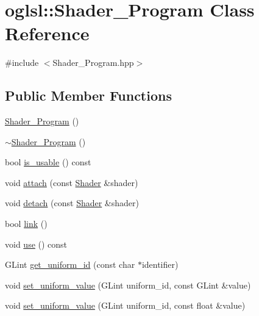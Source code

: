 \hypertarget{classoglsl_1_1_shader___program}{}\section{oglsl\+:\+:Shader\+\_\+\+Program Class Reference}
\label{classoglsl_1_1_shader___program}


{\ttfamily \#include $<$Shader\+\_\+\+Program.\+hpp$>$}

\subsection*{Public Member Functions}
\begin{DoxyCompactItemize}
\item 
\mbox{\hyperlink{classoglsl_1_1_shader___program_ae5615f167ca4f6991ee4d7e75625e8e1}{Shader\+\_\+\+Program}} ()
\item 
\mbox{\hyperlink{classoglsl_1_1_shader___program_a632041a7db2cd19b7be88f4223085cdd}{$\sim$\+Shader\+\_\+\+Program}} ()
\item 
bool \mbox{\hyperlink{classoglsl_1_1_shader___program_abcf1f61c49728e6e4b2ed04bbdcc2413}{is\+\_\+usable}} () const
\item 
void \mbox{\hyperlink{classoglsl_1_1_shader___program_ac3dd7a7611533b0ad8a02dcca9a24a59}{attach}} (const \mbox{\hyperlink{classoglsl_1_1_shader}{Shader}} \&shader)
\item 
void \mbox{\hyperlink{classoglsl_1_1_shader___program_a54aec3bf30b58456f1f454e44618b724}{detach}} (const \mbox{\hyperlink{classoglsl_1_1_shader}{Shader}} \&shader)
\item 
bool \mbox{\hyperlink{classoglsl_1_1_shader___program_a91879ef2ebeee83ffddcbf6d7ec6904c}{link}} ()
\item 
void \mbox{\hyperlink{classoglsl_1_1_shader___program_ad68bd3ebd1b96464cb5708588e050044}{use}} () const
\item 
G\+Lint \mbox{\hyperlink{classoglsl_1_1_shader___program_a50588c2337e31efed044eb24f05d2e4e}{get\+\_\+uniform\+\_\+id}} (const char $\ast$identifier)
\item 
void \mbox{\hyperlink{classoglsl_1_1_shader___program_a28aae2ac780bb36b0753768bb65ecd2b}{set\+\_\+uniform\+\_\+value}} (G\+Lint uniform\+\_\+id, const G\+Lint \&value)
\item 
void \mbox{\hyperlink{classoglsl_1_1_shader___program_a04a17ba0d6065640fb54dd9a8671b2cb}{set\+\_\+uniform\+\_\+value}} (G\+Lint uniform\+\_\+id, const float \&value)

\end{DoxyCompactItemize}
